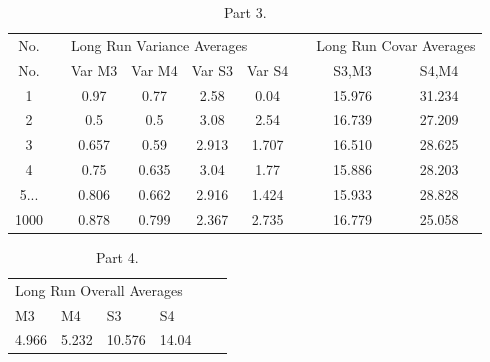 \documentclass[12pt]{article}
\begin{document}
\begin{table}[h]
\centering
\label{my-label}
\begin{tabular}{|c|c|c|c|c|c|c|c|c|}
\cline{1-9}
No.  &  & \multicolumn{4}{l|}{Long Run Variance Averages} &  & \multicolumn{2}{l|}{Long Run Covar Averages} \\ \cline{1-9}
No.  &  & Var M3     & Var M4     & Var S3    & Var S4    &  & S3,M3                 & S4,M4                 \\ \cline{1-9}
1    &  & 0.97       & 0.77       & 2.58      & 0.04      &  & 15.976             & 31.234               \\ \cline{1-9}
2    &  & 0.5        & 0.5        & 3.08      & 2.54      &  & 16.739             & 27.209               \\ \cline{1-9}
3    &  & 0.657      & 0.59       & 2.913     & 1.707     &  & 16.510            & 28.625            \\ \cline{1-9}
4    &  & 0.75       & 0.635      & 3.04      & 1.77      &  & 15.886             & 28.203             \\ \cline{1-9}
5... &  & 0.806      & 0.662      & 2.916     & 1.424     &  & 15.933               & 28.828              \\ \cline{1-9}
1000 &  & 0.878      & 0.799      & 2.367     & 2.735     &  & 16.779             & 25.058            \\ \cline{1-9}
\end{tabular}
\caption{Part 3.}
\end{table}


\begin{table}[h]
\centering
\label{my-label}
\begin{tabular}{cccccc}
\cline{1-4}
\multicolumn{4}{|l|}{Long Run Overall Averages}                                                                      \\ \cline{1-4}
\multicolumn{1}{|l|}{M3}    & \multicolumn{1}{l|}{M4}    & \multicolumn{1}{l|}{S3}     & \multicolumn{1}{l|}{S4}   \\ \cline{1-4}
\multicolumn{1}{|l|}{4.966} & \multicolumn{1}{l|}{5.232} & \multicolumn{1}{l|}{10.576} & \multicolumn{1}{l|}{14.04} \\ \cline{1-4}
\end{tabular}
\caption{Part 4.}
\end{table}
\end{document}
